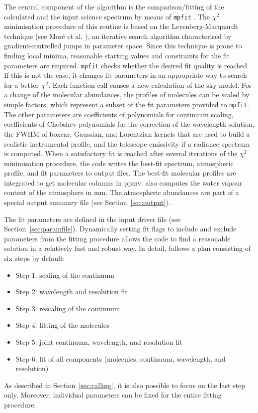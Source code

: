 The central component of the algorithm is the comparison/fitting of the
calculated and the input science spectrum by means of {\tt mpfit}
\cite{CMPFIT}. The $\chi^2$ minimisation procedure of this routine is based on
the Levenberg-Marquardt technique (see Mor\'e et al. \cite{MOR80}), an
iterative search algorithm characterised by gradient-controlled jumps in
parameter space. Since this technique is prone to finding local minima,
reasonable starting values and constraints for the fit parameters are required.
{\tt mpfit} checks whether the desired fit quality is reached. If this is not
the case, it changes fit parameters in an appropriate way to search for a better
$\chi^2$. Each function call causes a new calculation of the sky model. For a
change of the molecular abundances, the profiles of molecules can be scaled by
simple factors, which represent a subset of the fit parameters provided to
{\tt mpfit}. The other parameters are coefficients of polynomials for continuum
scaling, coefficients of Chebshev polynomials for the correction of the
wavelength solution, the FWHM of boxcar, Gaussian, and Lorentzian kernels
that are used to build a realistic instrumental profile, and the telescope
emissivity if a radiance spectrum is computed. When a satisfactory fit is
reached after several iterations of the $\chi^2$ minimisation procedure, the
code writes the best-fit spectrum, atmospheric profile, and fit parameters to
output files. The best-fit molecular profiles are integrated to get molecular
columns in ppmv. \mf{} also computes the water vapour content of the
atmosphere in mm. The atmospheric abundances are part of a special output
summary file (see Section~\ref{sec:output}).

The fit parameters are defined in the input driver file (see
Section~\ref{sec:paramfile}). Dynamically setting fit flags to include and
exclude parameters from the fitting procedure allows the code to find a
reasonable solution in a relatively fast and robust way. In detail,
\mf{} follows a plan consisting of six steps by default:
\begin{itemize}
    \item Step 1: scaling of the continuum
    \item Step 2: wavelength and resolution fit
    \item Step 3: rescaling of the continuum
    \item Step 4: fitting of the molecules
    \item Step 5: joint continuum, wavelength, and resolution fit
    \item Step 6: fit of all components (molecules, continuum, wavelength, and
                  resolution)
\end{itemize}
As described in Section~\ref{sec:calling}, it is also possible to focus on the
last step only. Moreover, individual parameters can be fixed for the entire
fitting procedure.

